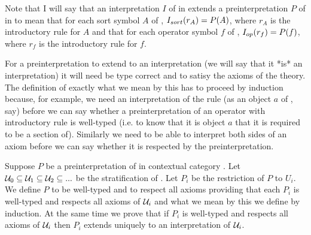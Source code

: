 Note that I will say that an interpretation $I$ of \gatUw in \catcw extends a preinterpretation $P$ of \gatUw in \catcw to mean that for each sort symbol $A$ of \gatU,
$I_{sort}(r_A) = P(A)$, where $r_A$ is the introductory rule for $A$ and that for each operator symbol
$f$ of \gatU,   $I_{op}(r_f) = P(f)$, where $r_f$ is the introductory rule for $f$.



\note
 For a preinterpretation to extend to an interpretation (we will say that it *is* an interpretation) 
it will need be type correct and to satisy the axioms of the theory. The definition of exactly what we mean by this has to proceed by induction because, for example, we need an interpretation of the rule
 (as an object $a$ of \catc, say) before we can say whether a preinterpretation of an operator with introductory rule \genericfintroductoryrule
is well-typed (i.e. to know that it is object $a$ that it is required to be a section of).
Similarly we need to be able to interpret both sides of an axiom before we can say whether it is respected
by the preinterpretation. 

\note Suppose $P$ be a preinterpretation of \gatUw in contextual category \catc.
Let $\mathcal{U}_0 \subseteq \mathcal{U}_1 \subseteq \mathcal{U}_2 \subseteq ...$ be the stratification of \gatU. 
Let $P_i$ be the restriction of $P$ to $U_i$. 
We define $P$ to be well-typed and to respect all axioms 
providing that  each  $P_i$ is well-typed and respects all axioms of $\mathcal{U}_i$ and 
what we mean by this we define by induction. 
At the same time we prove that if $P_i$ is well-typed and respects all axioms of $\mathcal{U}_i$ then $P_i$
extends uniquely to an interpretation of $\mathcal{U}_i$.  

